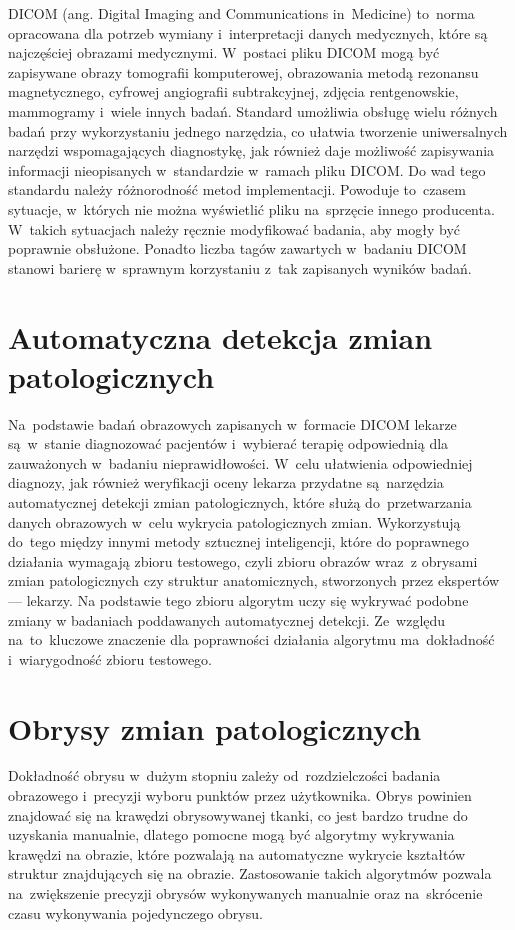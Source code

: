 \documentclass[a4paper,11pt,twoside,openright]{report}
\theoremstyle{definition}
\begin{document}
DICOM (ang. Digital Imaging and Communications in~Medicine) \cite{DICOM} to~norma
opracowana dla potrzeb wymiany i~interpretacji danych medycznych, które są
najczęściej obrazami medycznymi. W~postaci pliku DICOM mogą być zapisywane obrazy
tomografii komputerowej, obrazowania metodą rezonansu magnetycznego, cyfrowej
angiografii subtrakcyjnej, zdjęcia rentgenowskie, mammogramy i~wiele innych badań.
Standard umożliwia obsługę wielu różnych badań przy wykorzystaniu jednego narzędzia,
co ułatwia tworzenie uniwersalnych narzędzi wspomagających diagnostykę, jak również
daje możliwość zapisywania informacji nieopisanych w~standardzie w~ramach pliku DICOM.
Do wad tego standardu należy różnorodność metod implementacji. Powoduje to~czasem
sytuacje, w~których nie można wyświetlić pliku na~sprzęcie innego producenta.
W~takich sytuacjach należy ręcznie
modyfikować badania, aby mogły być poprawnie obsłużone. Ponadto liczba tagów zawartych w~badaniu
DICOM stanowi barierę w~sprawnym korzystaniu z~tak zapisanych wyników badań.

\section {Automatyczna detekcja zmian patologicznych}

Na~podstawie badań obrazowych zapisanych w~formacie DICOM lekarze są~w~stanie diagnozować
pacjentów i~wybierać terapię odpowiednią dla zauważonych w~badaniu nieprawidłowości.
W~celu ułatwienia odpowiedniej diagnozy, jak również weryfikacji oceny lekarza
przydatne są~narzędzia automatycznej detekcji zmian patologicznych,
które służą do~przetwarzania danych obrazowych w~celu
wykrycia patologicznych zmian. Wykorzystują do~tego między innymi metody sztucznej
inteligencji, które do poprawnego działania wymagają zbioru testowego, czyli zbioru obrazów
wraz~z obrysami zmian patologicznych czy struktur anatomicznych, stworzonych przez
ekspertów --- lekarzy. Na podstawie tego zbioru algorytm uczy się
wykrywać podobne zmiany w badaniach poddawanych automatycznej detekcji.
Ze~względu na~to~kluczowe znaczenie dla poprawności działania algorytmu ma~dokładność i~wiarygodność zbioru testowego.

\section {Obrysy zmian patologicznych}

Dokładność obrysu w~dużym stopniu zależy od~rozdzielczości badania obrazowego i~precyzji
wyboru punktów przez użytkownika. Obrys powinien znajdować się na krawędzi
obrysowywanej tkanki, co jest bardzo trudne do uzyskania manualnie,
dlatego pomocne mogą być algorytmy wykrywania krawędzi na obrazie, które pozwalają na automatyczne
wykrycie kształtów struktur znajdujących się na obrazie. Zastosowanie takich algorytmów
pozwala na~zwiększenie precyzji obrysów wykonywanych manualnie oraz na~skrócenie
czasu wykonywania pojedynczego obrysu.
\end{document}
